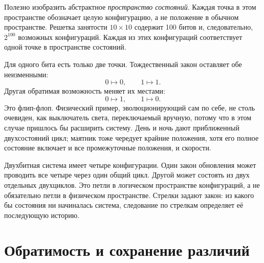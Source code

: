 Полезно изобразить абстрактное \emph{пространство состояний}. Каждая точка в этом пространстве обозначает целую конфигурацию, а не положение в обычном пространстве. Решетка занятости \(10\times10\) содержит 100 битов и, следовательно, \(2^{100}\) возможных конфигураций. Каждая из этих конфигураций соответствует одной точке в пространстве состояний.

Для одного бита есть только две точки. Тождественный закон оставляет обе неизменными:
\begin{equation}
  0\mapsto0,
  \qquad
  1\mapsto1.
  \label{eq:l01-identity-update}
\end{equation}
Другая обратимая возможность меняет их местами:
\begin{equation}
  0\mapsto1,
  \qquad
  1\mapsto0.
  \label{eq:l01-flip-update}
\end{equation}
Это флип-флоп. Физический пример, эволюционирующий сам по себе, не столь очевиден, как выключатель света, переключаемый вручную, потому что в этом случае пришлось бы расширить систему. День и ночь дают приближенный двухсостояний цикл; маятник тоже чередует крайние положения, хотя его полное состояние включает и все промежуточные положения, и скорости.

\begin{classroomqa}
\end{classroomqa}

Двухбитная система имеет четыре конфигурации. Один закон обновления может проводить все четыре через один общий цикл. Другой может состоять из двух отдельных двухциклов. Это петли в логическом пространстве конфигураций, а не обязательно петли в физическом пространстве. Стрелки задают закон: из какого бы состояния ни начиналась система, следование по стрелкам определяет её последующую историю.

\section{Обратимость и сохранение различий}

